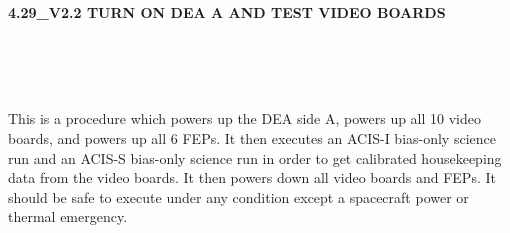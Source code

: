 \documentclass[11pt]{article}
\begin{document}
%
%
%
\newcommand{\be}{\begin{enumerate}}
\newcommand{\ee}{\end{enumerate}}
\newcommand{\bc}{\begin{center}}
\newcommand{\ec}{\end{center}}
\newcommand{\bi}{\begin{itemize}}
\newcommand{\ei}{\end{itemize}}
\newcommand{\bd}{\begin{description}}
\newcommand{\ed}{\end{description}}
\newcommand{\bt}{\begin{tabbing}}
\newcommand{\et}{\end{tabbing}}
\newcommand{\eg}{{\it e.g.~}}
\newcommand{\ie}{{\it i.e.~}}
\newcommand{\ul}{\underline}
\newcommand{\axaf}{{\em AXAF}}
\def\la{\hbox{\rlap{$<$}\lower0.5ex\hbox{$\sim$}\ }}


\large
\centerline {\bf 4.29\_V2.2 TURN ON DEA A AND TEST VIDEO BOARDS }
\vspace{0.25in}

\normalsize
{}\\
 \\


 \\
\normalsize

This is a procedure which powers up the DEA side A, powers up all 10 video boards, and powers up all 6 FEPs. It then executes an ACIS-I bias-only science run and an ACIS-S bias-only science run in order to get calibrated housekeeping data from the video boards. It then powers down all video boards and FEPs. It should be safe to execute under any condition except a spacecraft power or thermal emergency.
\end{document}
